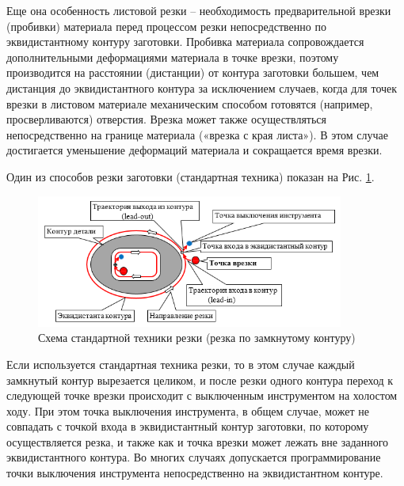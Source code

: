 \documentclass[12pt]{report}
\begin{document}
Еще она особенность листовой резки –
необходимость предварительной врезки (пробивки)
материала перед процессом резки непосредственно
по эквидистантному контуру заготовки.
Пробивка материала сопровождается дополнительными
деформациями материала в точке врезки,
поэтому производится на расстоянии (дистанции)
от контура заготовки большем,
чем дистанция до эквидистантного контура за исключением случаев,
когда для точек врезки в листовом материале механическим способом
готовятся (например, просверливаются)
отверстия.
Врезка может также осуществляться
непосредственно на границе материала
(«врезка с края листа»).
В этом случае достигается уменьшение
деформаций материала и сокращается время врезки.

Один из способов резки заготовки (стандартная техника)
показан на Рис. \ref{standard-cutting}.

\begin{figure}
  \begin{center}
  \includegraphics[width=0.9\textwidth]{cutting-path.png}
  \caption{Схема стандартной техники резки (резка по замкнутому контуру)}
  \label{standard-cutting}
  \end{center}
\end{figure}

Если используется стандартная техника резки,
то в этом случае каждый замкнутый контур вырезается целиком,
и после резки одного контура переход к следующей точке врезки
происходит с выключенным инструментом на холостом ходу.
При этом точка выключения инструмента, в общем случае,
может не совпадать с точкой входа в эквидистантный контур заготовки,
по которому осуществляется резка, и также как и точка врезки
может лежать вне заданного эквидистантного контура.
Во многих случаях допускается программирование точки выключения
инструмента непосредственно на эквидистантном контуре.
\end{document}
